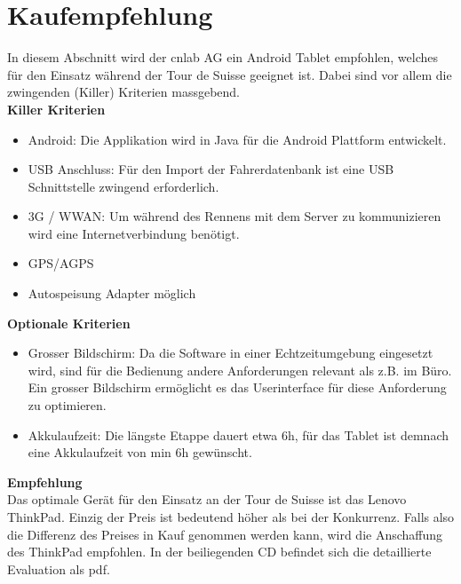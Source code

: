 \section{Kaufempfehlung}
\label{ref:kaufempfehlung}
In diesem Abschnitt wird der cnlab AG ein Android Tablet empfohlen, welches für den Einsatz während der Tour de Suisse geeignet ist. Dabei sind vor allem die zwingenden (Killer) Kriterien massgebend.
\\
\textbf{Killer Kriterien}
\begin{itemize}
\item Android: Die Applikation wird in Java für die Android Plattform entwickelt.
\item USB Anschluss: Für den Import der Fahrerdatenbank ist eine USB Schnittstelle zwingend erforderlich.
\item 3G / WWAN: Um während des Rennens mit dem Server zu kommunizieren wird eine Internetverbindung benötigt.
\item GPS/AGPS
\item Autospeisung Adapter möglich
\end{itemize}

\textbf{Optionale Kriterien}
\begin{itemize}
\item Grosser Bildschirm: Da die Software in einer Echtzeitumgebung eingesetzt wird, sind für die Bedienung andere Anforderungen relevant als z.B. im Büro. Ein grosser Bildschirm ermöglicht es das Userinterface für diese Anforderung zu optimieren.
\item Akkulaufzeit: Die längste Etappe dauert etwa 6h, für das Tablet ist demnach eine Akkulaufzeit von min 6h gewünscht.
\end{itemize}


\textbf{Empfehlung}
\\
Das optimale Gerät für den Einsatz an der Tour de Suisse ist das Lenovo ThinkPad. Einzig der Preis ist bedeutend höher als bei der Konkurrenz. Falls also die Differenz des Preises in Kauf genommen werden kann, wird die Anschaffung des ThinkPad empfohlen. In der beiliegenden CD befindet sich die detaillierte Evaluation als pdf.

